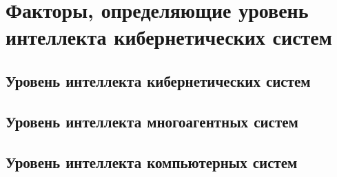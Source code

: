 \chapter{Факторы, определяющие уровень интеллекта кибернетических систем}
\label{chapter_intro}


\section{Уровень интеллекта кибернетических систем}
\section{Уровень интеллекта многоагентных систем}
\label{section_mas}

\section{Уровень интеллекта компьютерных систем}

%